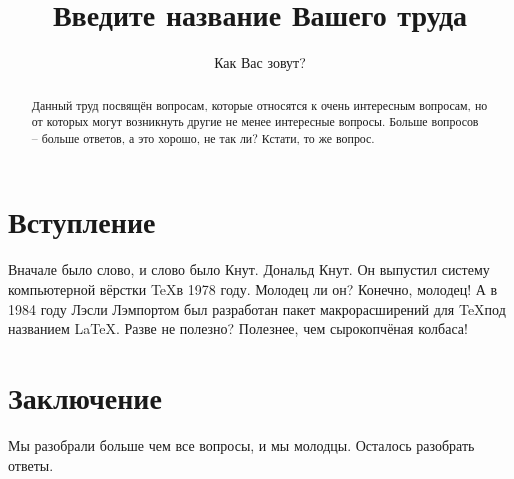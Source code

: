 \documentclass[a4paper,12pt]{report}
\title{Введите название Вашего труда}
\author{Как Вас зовут?}
\begin{document}
\maketitle
\begin{abstract}
Данный труд посвящён вопросам, которые относятся к очень интересным вопросам, но от которых могут возникнуть другие не менее интересные вопросы. Больше вопросов -- больше ответов, а это хорошо, не так ли? Кстати, то же вопрос.
\end{abstract}
\tableofcontents
\setlength{\parindent}{1.5em}
\chapter{Вступление}

Вначале было слово, и слово было Кнут. Дональд Кнут. Он выпустил систему компьютерной вёрстки \TeX в 1978 году. Молодец ли он? Конечно, молодец! А в 1984 году Лэсли Лэмпортом был разработан пакет макрорасширений для \TeX под названием \LaTeX. Разве не полезно? Полезнее, чем сырокопчёная колбаса!

\chapter{Заключение}
Мы разобрали больше чем все вопросы, и мы молодцы. Осталось разобрать ответы.


 
\end{document}
